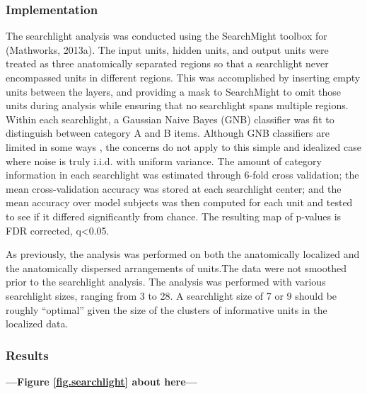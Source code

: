 \subsubsection{Implementation}
The searchlight analysis was conducted using the SearchMight toolbox \cite{pereira_information_2011} for \matlab (Mathworks, 2013a). The input units, hidden units, and output units were treated as three anatomically separated regions so that a searchlight never encompassed units in different regions. This was accomplished by inserting empty units between the layers, and providing a mask to SearchMight to omit those units during analysis while ensuring that no searchlight spans multiple regions. Within each searchlight, a Gaussian Naive Bayes (GNB) classifier was fit to distinguish between category A and B items. Although GNB classifiers are limited in some ways \cite{pereira_information_2011}, the concerns do not apply to this simple and idealized case where noise is truly i.i.d. with uniform variance. The amount of category information in each searchlight was estimated through 6-fold cross validation; the mean cross-validation accuracy was stored at each searchlight center; and the mean accuracy over model subjects was then computed for each unit and tested to see if it differed significantly from chance. The resulting map of p-values is FDR corrected, q<0.05.

As previously, the analysis was performed on both the anatomically localized and the anatomically dispersed arrangements of units.The data were not smoothed prior to the searchlight analysis. The analysis was performed with various searchlight sizes, ranging from 3 to 28. A searchlight size of 7 or 9 should be roughly ``optimal'' given the size of the clusters of informative units in the localized data.

\subsubsection{Results} 

\begin{center}
\textbf{---Figure \ref{fig.searchlight} about here---}
\end{center}


